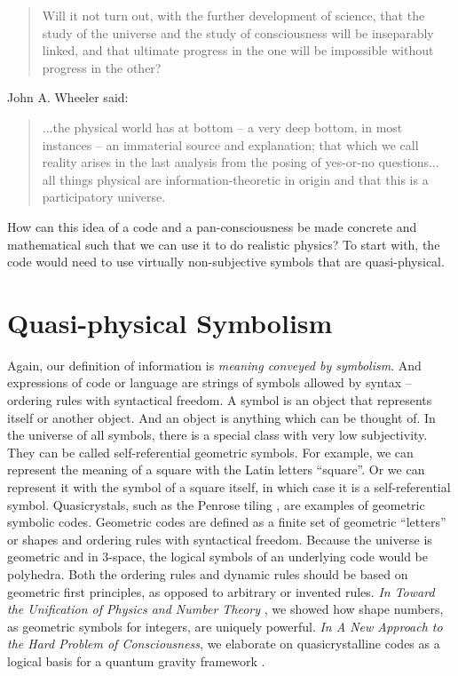\documentclass[submission,copyright,creativecommons]{eptcs}
\begin{document}
\begin{quote}
Will it not turn out, with the further development of science, that the study of the universe and the study of consciousness will be inseparably linked, and that ultimate progress in the one will be impossible without progress in the other?
\end{quote}
John A. Wheeler \cite{wheeler1990information} said:

\begin{quote}
...the physical world has at bottom -- a very deep bottom, in most instances -- an immaterial source and explanation; that which we call reality arises in the last analysis from the posing of yes-or-no questions... all things physical are information-theoretic in origin and that this is a participatory universe.
\end{quote}
How can this idea of a code and a pan-consciousness be made concrete and mathematical such that we can use it to do realistic physics? To start with, the code would need to use virtually non-subjective symbols that are quasi-physical.

\section{Quasi-physical Symbolism}
\label{sec:3}

Again, our definition of information is \textit{meaning conveyed by symbolism}. And expressions of code or language are strings of symbols allowed by syntax -- ordering rules with syntactical freedom. A symbol is an object that represents itself or another object. And an object is anything which can be thought of. In the universe of all symbols, there is a special class with very low subjectivity. They can be called self-referential geometric symbols. For example, we can represent the meaning of a square with the Latin letters “square”. Or we can represent it with the symbol of a square itself, in which case it is a self-referential symbol. Quasicrystals, such as the Penrose tiling \cite{penrose1974r}, are examples of geometric symbolic codes. Geometric codes are defined as a finite set of geometric “letters” or shapes and ordering rules with syntactical freedom. Because the universe is geometric and in 3-space, the logical symbols of an underlying code would be polyhedra. Both the ordering rules and dynamic rules should be based on geometric first principles, as opposed to arbitrary or invented rules. \textit{In Toward the Unification of Physics and Number Theory} \cite{irwin2017toward}, we showed how shape numbers, as geometric symbols for integers, are uniquely powerful. \textit{In A New Approach to the Hard Problem of Consciousness}, we elaborate on quasicrystalline codes as a logical basis for a quantum gravity framework \cite{irwin2014new}.
\end{document}
